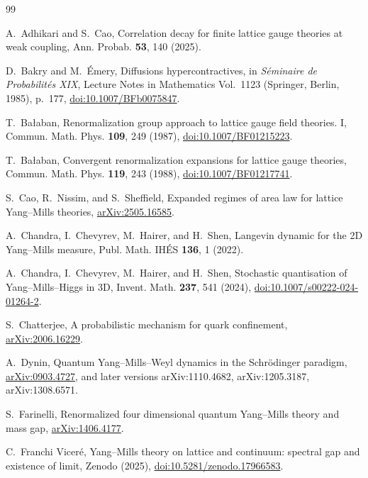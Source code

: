\documentclass[aps,prd,twocolumn,superscriptaddress,nofootinbib,floatfix]{revtex4-2}
\theoremstyle{definition}
\theoremstyle{remark}
\begin{document}
\raggedright
\begin{thebibliography}{99}

A.~Adhikari and S.~Cao,
Correlation decay for finite lattice gauge theories at weak coupling,
Ann. Probab. \textbf{53}, 140 (2025).

D.~Bakry and M.~\'Emery, Diffusions hypercontractives, in
\emph{S\'eminaire de Probabilit\'es XIX}, Lecture Notes in Mathematics
Vol.~1123 (Springer, Berlin, 1985), p.~177,
\href{https://doi.org/10.1007/BFb0075847}{doi:10.1007/BFb0075847}.

T.~Ba{\l}aban, Renormalization group approach to lattice gauge field
theories. I, Commun. Math. Phys. \textbf{109}, 249 (1987),
\href{https://doi.org/10.1007/BF01215223}{doi:10.1007/BF01215223}.

T.~Ba{\l}aban, Convergent renormalization expansions for lattice gauge
theories, Commun. Math. Phys. \textbf{119}, 243 (1988),
\href{https://doi.org/10.1007/BF01217741}{doi:10.1007/BF01217741}.

S.~Cao, R.~Nissim, and S.~Sheffield, Expanded regimes of area law for
lattice Yang--Mills theories,
\href{https://arxiv.org/abs/2505.16585}{arXiv:2505.16585}.

A.~Chandra, I.~Chevyrev, M.~Hairer, and H.~Shen, Langevin dynamic for the
2D Yang--Mills measure, Publ. Math. IH\'ES \textbf{136}, 1 (2022).

A.~Chandra, I.~Chevyrev, M.~Hairer, and H.~Shen, Stochastic quantisation
of Yang--Mills--Higgs in 3D, Invent. Math. \textbf{237}, 541 (2024),
\href{https://doi.org/10.1007/s00222-024-01264-2}{doi:10.1007/s00222-024-01264-2}.

S.~Chatterjee, A probabilistic mechanism for quark confinement,
\href{https://arxiv.org/abs/2006.16229}{arXiv:2006.16229}.

A.~Dynin, Quantum Yang--Mills--Weyl dynamics in the Schr\"odinger
paradigm, \href{https://arxiv.org/abs/0903.4727}{arXiv:0903.4727}, and
later versions arXiv:1110.4682, arXiv:1205.3187, arXiv:1308.6571.

S.~Farinelli, Renormalized four dimensional quantum Yang--Mills theory
and mass gap, \href{https://arxiv.org/abs/1406.4177}{arXiv:1406.4177}.

C.~Franchi Vicer\'e, Yang--Mills theory on lattice and continuum:
spectral gap and existence of limit, Zenodo (2025),
\href{https://doi.org/10.5281/zenodo.17966583}{doi:10.5281/zenodo.17966583}.


\end{thebibliography}
\end{document}
